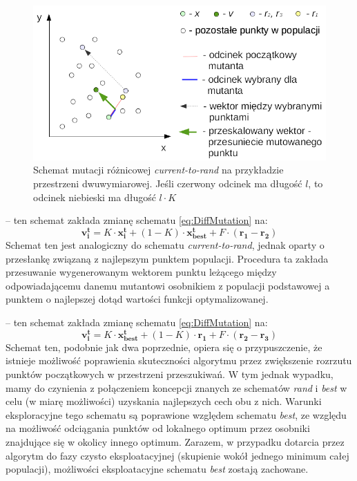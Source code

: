 \documentclass[12pt,a4paper]{report}
\begin{document}
{{{{\begin{description}
\begin{figure}[h]
\begin{center}\includegraphics[scale=0.8]{img/current-to-rand-mutation.png}\end{center}
\caption{Schemat mutacji różnicowej \emph{current-to-rand} na przykładzie przestrzeni dwuwymiarowej. Jeśli czerwony odcinek ma długość $l$, to odcinek niebieski ma długość $l \cdot K$}
\label{current-to-rand-img}
\end{figure}


\item[current-to-best] \cite{PracticalInsights} -- ten schemat zakłada zmianę schematu \ref{eq:DiffMutation} na:
\begin{equation}
\mathbf{v_i^{t}} = K \cdot \mathbf{x_i^t} + (1 - K) \cdot \mathbf{x_{best}^t} + F \cdot (\mathbf{r_{1}} - \mathbf{r_{2}})
\end{equation}
Schemat ten jest analogiczny do schematu \emph{current-to-rand}, jednak oparty o przesłankę związaną z najlepszym punktem populacji. Procedura ta zakłada przesuwanie wygenerowanym wektorem punktu leżącego między odpowiadającemu danemu mutantowi osobnikiem z populacji podstawowej a punktem o najlepszej dotąd wartości funkcji optymalizowanej.


\item[rand-to-best] \cite{PracticalInsights} -- ten schemat zakłada zmianę schematu \ref{eq:DiffMutation} na:
\begin{equation}
\mathbf{v_i^{t}} = K \cdot \mathbf{x_{best}^t} + (1 - K) \cdot \mathbf{r_1} + F \cdot (\mathbf{r_{2}} - \mathbf{r_{3}})
\end{equation}
Schemat ten, podobnie jak dwa poprzednie, opiera się o przypuszczenie, że istnieje możliwość poprawienia skuteczności algorytmu przez zwiększenie rozrzutu punktów początkowych w przestrzeni przeszukiwań. W tym jednak wypadku, mamy do czynienia z połączeniem koncepcji znanych ze schematów \emph{rand} i \emph{best} w celu (w miarę możliwości) uzyskania najlepszych cech obu z nich. Warunki eksploracyjne tego schematu są poprawione względem schematu \emph{best}, ze względu na możliwość odciągania punktów od lokalnego optimum przez osobniki znajdujące się w okolicy innego optimum. Zarazem, w przypadku dotarcia przez algorytm do fazy czysto eksploatacyjnej (skupienie wokół jednego minimum całej populacji), możliwości eksploatacyjne schematu \emph{best} zostają zachowane.


\end{description}}}}}
\end{document}
